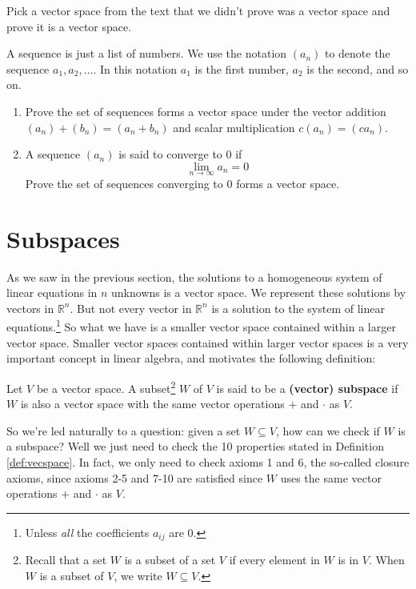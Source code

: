\begin{problem}
	Pick a vector space from the text that we didn't prove was a vector space and prove it is a vector space.
\end{problem}

\begin{problem}
	A sequence is just a list of numbers. We use the notation $(a_n)$ to denote the sequence $a_1, a_2, \ldots$. In this notation $a_1$ is the first number, $a_2$ is the second, and so on. 
	\begin{enumerate}
		\item Prove the set of sequences forms a vector space under the vector addition $(a_n) + (b_n) = (a_n + b_n)$ and scalar multiplication $c(a_n) = (ca_n)$.
		\item A sequence $(a_n)$ is said to converge to $0$ if
		$$
		\lim_{n\to\infty} a_n = 0
		$$
		Prove the set of sequences converging to 0 forms a vector space.
	\end{enumerate}
\end{problem}

\section{Subspaces}

As we saw in the previous section, the solutions to a homogeneous system of linear equations in $n$ unknowns is a vector space. We represent these solutions by vectors in $\mathbb{R}^n$. But not every vector in $\mathbb{R}^n$ is a solution to the system of linear equations.\footnote{Unless \textit{all} the coefficients $a_{ij}$ are 0.} So what we have is a smaller vector space contained within a larger vector space. Smaller vector spaces contained within larger vector spaces is a very important concept in linear algebra, and motivates the following definition:

\begin{definition}
	Let $V$ be a vector space. A subset\footnote{Recall that a set $W$ is a subset of a set $V$ if every element in $W$ is in $V$. When $W$ is a subset of $V$, we write $W \subseteq V$.} $W$ of $V$ is said to be a \textbf{(vector) subspace} if $W$ is also a vector space with the same vector operations $+$ and $\cdot$ as $V$.
\end{definition}

So we're led naturally to a question: given a set $W \subseteq V$, how can we check if $W$ is a subspace? Well we just need to check the 10 properties stated in Definition \ref{def:vecspace}. In fact, we only need to check axioms 1 and 6, the so-called closure axioms, since axioms 2-5 and 7-10 are satisfied since $W$ uses the same vector operations $+$ and $\cdot$ as $V$.

